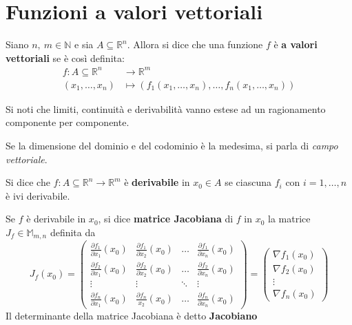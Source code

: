\section{Funzioni a valori vettoriali}
\begin{definition} \label{Def: Funzioni a valori vettoriali}
    Siano $n,\ m \in \mathbb{N}$ e sia $A \subseteq \mathbb{R}^n$. Allora si dice che una funzione $f$ è \textbf{a valori vettoriali} se è così definita:
    \begin{equation*}
    \begin{aligned}
        f:A \subseteq \mathbb{R}^n &\to \mathbb{R}^m\\
        (x_1, \dots, x_n) &\mapsto (f_1(x_1, \dots, x_n), \dots, f_n(x_1, \dots, x_n))
    \end{aligned}
    \end{equation*}
\end{definition}
\begin{oss}
    Si noti che limiti, continuità e derivabilità vanno estese ad un ragionamento componente per componente.
\end{oss}
\begin{oss}
    Se la dimensione del dominio e del codominio è la medesima, si parla di \textit{campo vettoriale}.
\end{oss}
\begin{definition} \label{Def: Derivabilità di f. vettoriali}
    Si dice che $f:A \subseteq \mathbb{R}^n \to \mathbb{R}^m$ è \textbf{derivabile} in $x_0 \in A$ se ciascuna $f_i$ con $i=1, \dots, n$ è ivi derivabile.
\end{definition}
\begin{definition} \label{Def: Matrice Jacobiana}
    Se $f$ è derivabile in $x_0$, si dice \textbf{matrice Jacobiana} di $f$ in $x_0$ la matrice $J_f \in \mathbb{M}_{m,n}$ definita da
    \begin{equation} \label{Eq: Matrice Jacobiana}
        J_f(x_0)=\begin{pmatrix}
            \frac{\partial{f_1}}{\partial{x_1}}(x_0) & \frac{\partial{f_1}}{\partial{x_2}}(x_0)& \dots & \frac{\partial{f_1}}{\partial{x_n}}(x_0)\\
            \frac{\partial{f_2}}{\partial{x_1}}(x_0)& \frac{\partial{f_2}}{\partial{x_2}}(x_0)& \dots & \frac{\partial{f_2}}{\partial{x_n}}(x_0)\\
            \vdots & \vdots & \ddots & \vdots\\
            \frac{\partial{f_n}}{\partial{x_1}}(x_0) & \frac{\partial{f_n}}{x_2}(x_0)& \dots & \frac{\partial{f_n}}{\partial{x_n}}(x_0)
        \end{pmatrix}
        =
        \begin{pmatrix}
            \nabla f_1 (x_0)\\
            \nabla f_2(x_0)\\
            \vdots\\
            \nabla f_n(x_0)
        \end{pmatrix}
    \end{equation}
    Il determinante della matrice Jacobiana è detto \textbf{Jacobiano} \label{Def: Jacobiano}
\end{definition}
